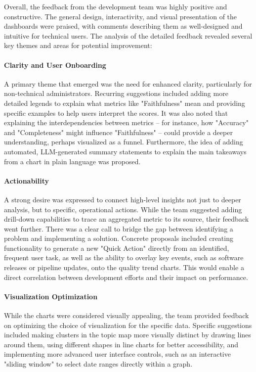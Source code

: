 \documentclass[
	english,
	ruledheaders=section,%
	class=report,%
	thesis={type=bachelor},%
	accentcolor=1b,%
	custommargins=true,%
	marginpar=false,%
	parskip=half-,%
	fontsize=11pt,%
	DIV=14,
]{tudapub}
\begin{document}
Overall, the feedback from the development team was highly positive and constructive. The general design, interactivity, and visual presentation of the dashboards were praised, with comments describing them as well-designed and intuitive for technical users. The analysis of the detailed feedback revealed several key themes and areas for potential improvement:

\paragraph{Clarity and User Onboarding} A primary theme that emerged was the need for enhanced clarity, particularly for non-technical administrators. Recurring suggestions included adding more detailed legends to explain what metrics like "Faithfulness" mean and providing specific examples to help users interpret the scores. It was also noted that explaining the interdependencies between metrics -- for instance, how "Accuracy" and "Completeness" might influence "Faithfulness" -- could provide a deeper understanding, perhaps visualized as a funnel. Furthermore, the idea of adding automated, LLM-generated summary statements to explain the main takeaways from a chart in plain language was proposed.
\paragraph{Actionability} A strong desire was expressed to connect high-level insights not just to deeper analysis, but to specific, operational actions. While the team suggested adding drill-down capabilities to trace an aggregated metric to its source, their feedback went further. There was a clear call to bridge the gap between identifying a problem and implementing a solution. Concrete proposals included creating functionality to generate a new "Quick Action" directly from an identified, frequent user task, as well as the ability to overlay key events, such as software releases or pipeline updates, onto the quality trend charts. This would enable a direct correlation between development efforts and their impact on performance.
\paragraph{Visualization Optimization} While the charts were considered visually appealing, the team provided feedback on optimizing the choice of visualization for the specific data. Specific suggestions included making clusters in the topic map more visually distinct by drawing lines around them, using different shapes in line charts for better accessibility, and implementing more advanced user interface controls, such as an interactive "sliding window" to select date ranges directly within a graph.
\end{document}
